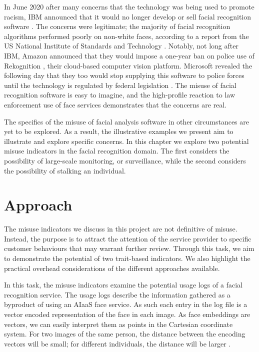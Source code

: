 \documentclass[a4paper,12pt]{report}
\begin{document}
	In June 2020 after many concerns that the technology was being used to promote racism, IBM announced that it would no longer develop or sell facial recognition software \cite{IBMsaysi68}. The concerns were legitimate; the majority of facial recognition algorithms performed poorly on non-white faces, according to a report from the US National Institute of Standards and Technology \cite{NISTStud33:online}. Notably, not long after IBM, Amazon announced that they would impose a one-year ban on police use of Rekognition \cite{Weareimp80:online}, their cloud-based computer vision platform. Microsoft revealed the following day that they too would stop supplying this software to police forces until the technology is regulated by federal legislation \cite{greene2020microsoft}. The misuse of facial recognition software is easy to imagine, and the high-profile reaction to law enforcement use of face services demonstrates that the concerns are real.
	
	The specifics of the misuse of facial analysis software in other circumstances are yet to be explored. As a result, the illustrative examples we present aim to illustrate and explore specific concerns. In this chapter we explore two potential misuse indicators in the facial recognition domain. The first considers the possibility of large-scale monitoring, or surveillance, while the second considers the possibility of stalking an individual.
	
	\section{Approach}
	The misuse indicators we discuss in this project are not definitive of misuse. Instead, the purpose is to attract the attention of the service provider to specific customer behaviours that may warrant further review. Through this task, we aim to demonstrate the potential of two trait-based indicators. We also highlight the practical overhead considerations of the different approaches available.
	
	In this task, the misuse indicators examine the potential usage logs of a facial recognition service. The usage logs describe the information gathered as a byproduct of using an AIaaS face service. As such each entry in the log file is a vector encoded representation of the face in each image. As face embeddings are vectors, we can easily interpret them as points in the Cartesian coordinate system. For two images of the same person, the distance between the encoding vectors will be small; for different individuals, the distance will be larger \cite{schroff2015facenet}.
	
\end{document}
